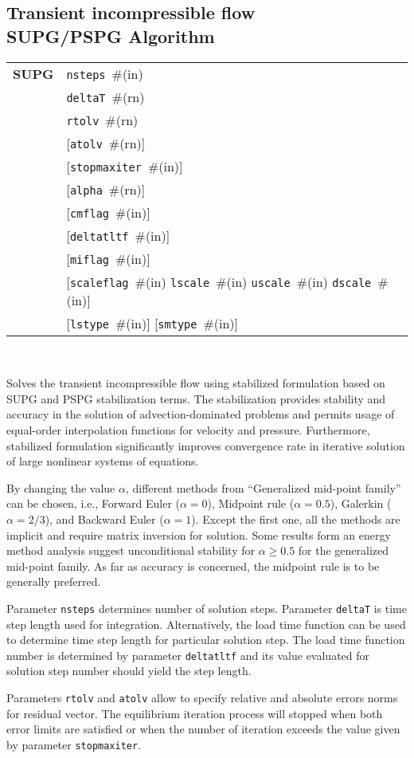 \documentclass[a4paper]{article}
\newcommand{\param}[1]{\texttt{#1}} %
\newcommand{\optional}[1]{[#1]} %
\newcommand{\field}[2]{\param{#1}~\#{\tiny(#2)}} %
\newcommand{\optField}[2]{\optional{\field{#1}{#2}}}
\newcommand{\entKeywordInst}[1]{\textbf{#1}} %
\newenvironment{record}[1][]{\begin{tabular}{|ll}}{\end{tabular}\\}
\newcommand{\recentry}[2]{{#1}&{#2}\\}
\newcounter{rcc}
\newenvironment{record}[1][\textwidth]{\setcounter{rcc}{0}\rowcolors{1}{lightgray}{lightgray}\tabularx{#1}{llR} \hline}
               {\endtabularx}
\newcommand{\recentry}[2]{\ifthenelse{\value{rcc}>0}{$\backslash$ \\}{\setcounter{rcc}{1}}{#1}&{#2}&}
\begin{document}
\subsection{Transient incompressible flow\\SUPG/PSPG Algorithm}
\label{supgIncomp}
\begin{record}
  \recentry{\entKeywordInst{SUPG}}{\field{nsteps}{in}}
  \recentry{}{\field{deltaT}{rn}}
  \recentry{}{\field{rtolv}{rn}}
  \recentry{}{\optField{atolv}{rn}}
  \recentry{}{\optField{stopmaxiter}{in}}
  \recentry{}{\optField{alpha}{rn}}
  \recentry{}{\optField{cmflag}{in}}
  \recentry{}{\optField{deltatltf}{in}}
  \recentry{}{\optField{miflag}{in}}
  \recentry{}{\optional{\field{scaleflag}{in} \field{lscale}{in} \field{uscale}{in} \field{dscale}{in}}}
  \recentry{}{\optField{lstype}{in} \optField{smtype}{in}}
\end{record}

Solves the transient incompressible flow using stabilized formulation
based on SUPG and PSPG
stabilization terms. The stabilization provides
stability and accuracy in the solution of
advection-dominated problems and permits usage of equal-order
interpolation functions for velocity and pressure. Furthermore,
stabilized formulation significantly improves convergence rate in
iterative solution of large nonlinear systems of equations.

By changing the value $\alpha$, different methods from
``Generalized mid-point family'' can be chosen, i.e.,
Forward Euler ($\alpha=0$), Midpoint rule ($\alpha=0.5$),
 Galerkin ($\alpha=2/3$), and  Backward Euler ($\alpha=1$). Except
the first one, all the methods are implicit and require matrix inversion for solution.
Some results form an energy method analysis suggest unconditional
stability for $\alpha\ge 0.5$ for the generalized mid-point family. As
far as accuracy is concerned, the midpoint rule is to be generally preferred.

Parameter \param{nsteps} determines number of solution
steps. Parameter \param{deltaT} is time step length used for
integration. Alternatively, the load time function can be used to
determine time step length for particular solution step. The load time
function number is determined by parameter \param{deltatltf} and its
value evaluated for solution step number should yield the step length.

Parameters \param{rtolv} and \param{atolv} allow to
specify relative and absolute errors norms for residual vector.
The equilibrium iteration process will stopped when both error limits
are satisfied or when the number of iteration exceeds the value given
by parameter \param{stopmaxiter}.
\end{document}
